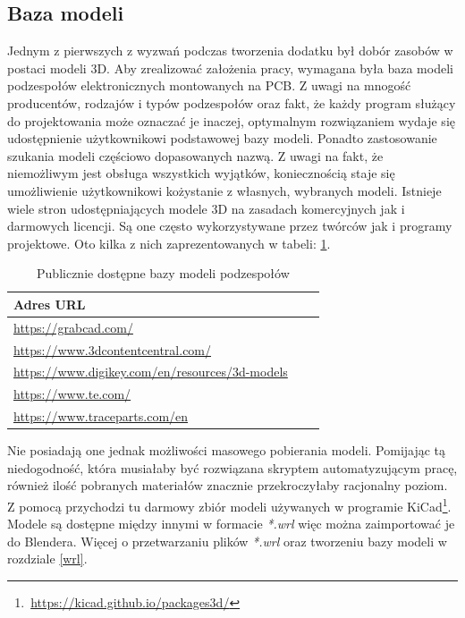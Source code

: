 \documentclass[brudnopis]{xmgr}
\begin{document}
\subsection{Baza modeli} \label{bazamodeli}

Jednym z pierwszych z wyzwań podczas tworzenia dodatku był dobór zasobów w postaci modeli 3D. Aby zrealizować założenia pracy, wymagana była baza modeli podzespołów elektronicznych montowanych na PCB. Z uwagi na mnogość producentów, rodzajów i typów podzespołów oraz fakt, że każdy program służący do projektowania może oznaczać je inaczej, optymalnym rozwiązaniem wydaje się udostępnienie użytkownikowi podstawowej bazy modeli. Ponadto zastosowanie szukania modeli częściowo dopasowanych nazwą. Z uwagi na fakt, że niemożliwym jest obsługa wszystkich wyjątków, koniecznością staje się umożliwienie użytkownikowi kożystanie z własnych, wybranych modeli. Istnieje wiele stron udostępniających modele 3D na zasadach komercyjnych jak i darmowych licencji. Są one często wykorzystywane przez twórców jak i programy projektowe. Oto kilka z nich zaprezentowanych w tabeli: \ref{fig:table}.

\begin{table}[htb]
\begin{tabular}{|l|l|l|} \hline
Adres URL \\ \hline
\url{https://grabcad.com/} \\ \hline
\url{https://www.3dcontentcentral.com/} \\ \hline
\url{https://www.digikey.com/en/resources/3d-models} \\ \hline
\url{https://www.te.com/} \\ \hline
\url{https://www.traceparts.com/en} \\ \hline
\end{tabular}
\caption{Publicznie dostępne bazy modeli podzespołów}
\label{fig:table}
\end{table}
Nie posiadają one jednak możliwości masowego pobierania modeli. Pomijając tą niedogodność, która musiałaby być rozwiązana skryptem automatyzującym pracę, również ilość pobranych materiałów znacznie przekroczyłaby racjonalny poziom. Z pomocą przychodzi tu darmowy zbiór modeli używanych w programie KiCad\footnote{\,\url{https://kicad.github.io/packages3d/}}. Modele są dostępne między innymi w formacie \emph{*.wrl} więc można zaimportować je do Blendera. Więcej o przetwarzaniu plików \emph{*.wrl} oraz tworzeniu bazy modeli w rozdziale \ref{wrl}.
\end{document}
